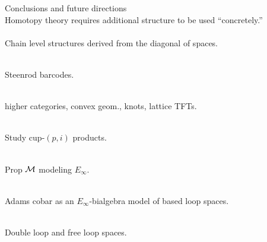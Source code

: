 
\begin{frame}{Conclusions and future directions}
	\pause
	 \\
	Homotopy theory requires additional structure to be used ``concretely.'' \\

	\medskip\pause
	 \\
	Chain level structures derived from the diagonal of spaces.

	\medskip\pause
	 \\
	Steenrod barcodes.

	\medskip\pause
	 \\
	higher categories, convex geom., knots, lattice TFTs.

	\medskip\pause
	 \\
	Study cup-$(p,i)$ products.

	\medskip\pause
	 \\
	Prop $\mathcal{M}$ modeling $E_\infty$.

	\medskip\pause
	 \\
	Adams cobar as an $E_\infty$-bialgebra model of based loop spaces.

	\medskip\pause
	 \\
	Double loop and free loop spaces.
\end{frame}